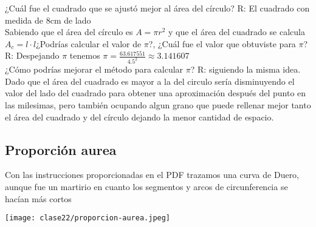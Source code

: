 ¿Cuál fue el cuadrado que se ajustó mejor al área del círculo? R: El cuadrado con medida de 8cm de lado\\
Sabiendo que el área del círculo es $A = \pi r^{2}$ y que el área del cuadrado se calcula $A_{c} = l \cdot l $¿Podrías calcular el valor de $\pi$?, ¿Cuál fue el valor que obtuviste para $\pi$? R: Despejando $\pi$ tenemos $\pi = \frac{63.617551}{4.5^{2}} \approx 3.141607$\\

¿Cómo podrías mejorar el método para calcular $\pi$? R: siguiendo la misma idea. Dado que el área del cuadrado es mayor a la del circulo sería disminuyendo el valor del lado del cuadrado para obtener una aproximación después del punto en las milesimas, pero también ocupando algun grano que puede rellenar mejor tanto el área del cuadrado y del círculo dejando la menor cantidad de espacio.
\subsection{Proporción aurea}
Con las instrucciones proporcionadas en el PDF trazamos una curva de Duero, aunque fue un martirio en cuanto los segmentos y arcos de circunferencia se hacían más cortos
\begin{center}
    \texttt{[image: clase22/proporcion-aurea.jpeg]}
\end{center}